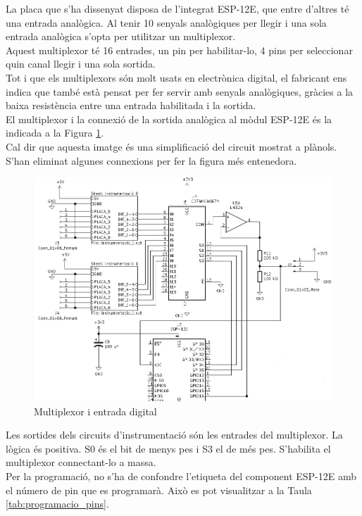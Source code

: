 La placa que s'ha dissenyat disposa de l'integrat ESP-12E, que entre d'altres té una entrada analògica. Al tenir 10 senyals analògiques per llegir i una sola entrada analògica s'opta per utilitzar un multiplexor.\\
\newline Aquest multiplexor té 16 entrades, un pin per habilitar-lo, 4 pins per seleccionar quin canal llegir i una sola sortida.\\
\newline Tot i que els multiplexors són molt usats en electrònica digital, el fabricant ens indica que també està pensat per fer servir amb senyals analògiques, gràcies a la baixa resistència entre una entrada habilitada i la sortida.\\
\newline El multiplexor i la connexió de la sortida analògica al mòdul ESP-12E és la indicada a la Figura \ref{fig:mux}.\\
\newline Cal dir que aquesta imatge és una simplificació del circuit mostrat a plànols. S'han eliminat algunes connexions per fer la figura més entenedora.

\begin{figure}[H]
\begin{center}
\includegraphics[scale=0.60]{images/mux.png}
\end{center}
\caption{Multiplexor i entrada digital}
\label{fig:mux}
\end{figure}

\noindent Les sortides dels circuits d'instrumentació són les entrades del multiplexor. La lògica és positiva. S0 és el bit de menys pes i S3 el de més pes. S'habilita el multiplexor connectant-lo a massa.\\
\newline Per la programació, no s'ha de confondre l'etiqueta del component ESP-12E amb el número de pin que es programarà. Això es pot visualitzar a la Taula \ref{tab:programacio_pins}.

